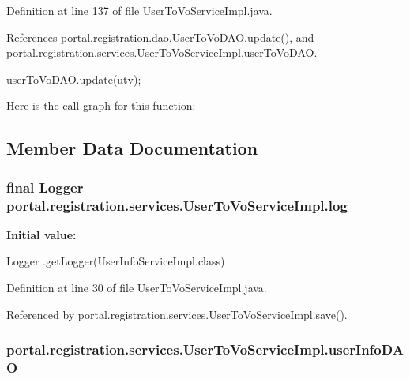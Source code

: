 Definition at line 137 of file UserToVoServiceImpl.java.



References portal.registration.dao.UserToVoDAO.update(), and portal.registration.services.UserToVoServiceImpl.userToVoDAO.


\begin{DoxyCode}
                                         {
                userToVoDAO.update(utv);

        }
\end{DoxyCode}


Here is the call graph for this function:




\subsection{Member Data Documentation}
\hypertarget{classportal_1_1registration_1_1services_1_1UserToVoServiceImpl_aedf6cd2507a03895aa381ef754e906a5}{
\subsubsection[{log}]{\setlength{\rightskip}{0pt plus 5cm}final Logger {\bf portal.registration.services.UserToVoServiceImpl.log}}}
\label{classportal_1_1registration_1_1services_1_1UserToVoServiceImpl_aedf6cd2507a03895aa381ef754e906a5}
{\bfseries Initial value:}
\begin{DoxyCode}
 Logger
                        .getLogger(UserInfoServiceImpl.class)
\end{DoxyCode}


Definition at line 30 of file UserToVoServiceImpl.java.



Referenced by portal.registration.services.UserToVoServiceImpl.save().

\hypertarget{classportal_1_1registration_1_1services_1_1UserToVoServiceImpl_a4009afa6dfdcd91350d08ccf127eb334}{
\subsubsection[{userInfoDAO}]{ {\bf portal.registration.services.UserToVoServiceImpl.userInfoDAO}}}
\label{classportal_1_1registration_1_1services_1_1UserToVoServiceImpl_a4009afa6dfdcd91350d08ccf127eb334}


